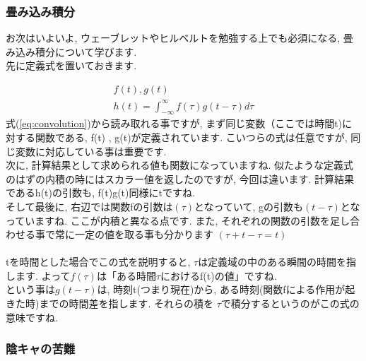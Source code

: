 \documentclass[11pt,a4paper]{jreport}
\begin{document}
\subsubsection{畳み込み積分 \label{convolution}}
お次はいよいよ, ウェーブレットやヒルベルトを勉強する上でも必須になる, 畳み込み積分について学びます.\\
先に定義式を置いておきます.

\begin{eqnarray}
\label{eq:convolution}
f(t) , g(t)\\
h(t) = \int^{\infty}_{-\infty} f(\tau) g(t - \tau) d\tau
\end{eqnarray}
式(\ref{eq:convolution})から読み取れる事ですが, まず同じ変数（ここでは時間t)に対する関数である, f(t) , g(t)が定義されています. こいつらの式は任意ですが, 同じ変数に対応している事は重要です. \\
次に, 計算結果として求められる値も関数になっていますね. 似たような定義式のはずの内積の時にはスカラー値を返したのですが, 今回は違います. 計算結果であるh(t)の引数も, f(t)g(t)同様にtですね.\\
そして最後に, 右辺では関数fの引数は$(\tau)$となっていて, gの引数も$(t - \tau)$となっていますね. ここが内積と異なる点です. また, それぞれの関数の引数を足し合わせる事で常に一定の値を取る事も分かります $(\tau + t - \tau = t)$\\
\\
tを時間とした場合でこの式を説明すると, $\tau$は定義域の中のある瞬間の時間を指します. よって$f(\tau)$は「ある時間$\tau$におけるf(t)の値」ですね.\\
という事は$g(t-\tau)$は, 時刻t(つまり現在)から, ある時刻(関数fによる作用が起きた時)までの時間差を指します. それらの積を $\tau$で積分するというのがこの式の意味ですね.\\


\subsubsection{陰キャの苦難}
\end{document}
